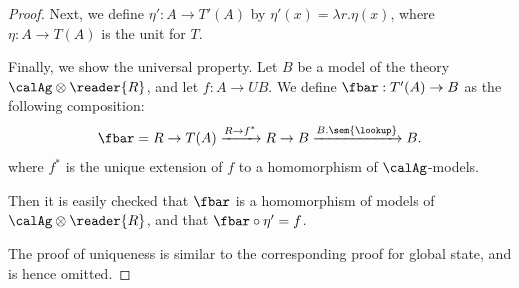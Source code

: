 \begin{proof}
Next, we define $\eta' : A \to T'(A)$ by 
%
$\eta'(x) = \lambda r.\eta(x)$, 
%
where $\eta : A \to T(A)$ is the unit for $T$.

Finally, we show the universal property.
%
Let $B$ be a model of the theory $\calAg \otimes \reader{R}$, and let $f : A \to UB$.
%
We define $\fbar : T'(A) \to B$ as the following composition:
%
\[ \fbar = 
    R \to T(A) \xrightarrow{R \to f^*} R \to B \xrightarrow{B.\sem{\lookup}} B.  \]
%
where $f^*$ is the unique extension of $f$ to a homomorphism of $\calAg$-models.

Then it is easily checked that $\fbar$ is a homomorphism of models of $\calAg
\otimes {\reader{R}}$, and that $\fbar \circ \eta' = f$.

The proof of uniqueness is similar to the corresponding proof for global state,
and is hence omitted.
\end{proof}

